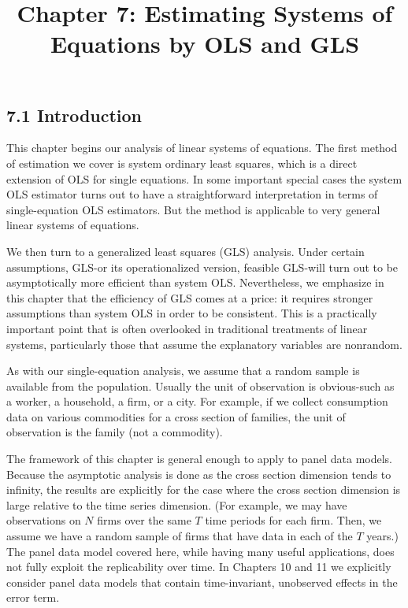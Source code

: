 \documentclass[10pt]{article}
\title{Chapter 7: Estimating Systems of Equations by OLS and GLS}
\author{}
\date{}
\begin{document}
\maketitle

\subsection*{7.1 Introduction}
This chapter begins our analysis of linear systems of equations. The first method of estimation we cover is system ordinary least squares, which is a direct extension of OLS for single equations. In some important special cases the system OLS estimator turns out to have a straightforward interpretation in terms of single-equation OLS estimators. But the method is applicable to very general linear systems of equations.

We then turn to a generalized least squares (GLS) analysis. Under certain assumptions, GLS-or its operationalized version, feasible GLS-will turn out to be asymptotically more efficient than system OLS. Nevertheless, we emphasize in this chapter that the efficiency of GLS comes at a price: it requires stronger assumptions than system OLS in order to be consistent. This is a practically important point that is often overlooked in traditional treatments of linear systems, particularly those that assume the explanatory variables are nonrandom.

As with our single-equation analysis, we assume that a random sample is available from the population. Usually the unit of observation is obvious-such as a worker, a household, a firm, or a city. For example, if we collect consumption data on various commodities for a cross section of families, the unit of observation is the family (not a commodity).

The framework of this chapter is general enough to apply to panel data models. Because the asymptotic analysis is done as the cross section dimension tends to infinity, the results are explicitly for the case where the cross section dimension is large relative to the time series dimension. (For example, we may have observations on $N$ firms over the same $T$ time periods for each firm. Then, we assume we have a random sample of firms that have data in each of the $T$ years.) The panel data model covered here, while having many useful applications, does not fully exploit the replicability over time. In Chapters 10 and 11 we explicitly consider panel data models that contain time-invariant, unobserved effects in the error term.
\end{document}
